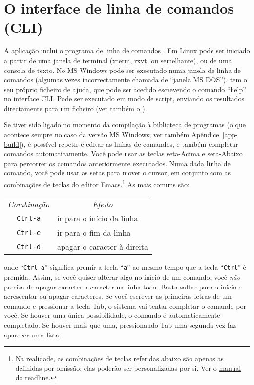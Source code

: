 \chapter{O interface de linha de comandos (CLI)}
\label{cli}

A aplicação  inclui o programa de linha de comandos .
Em Linux pode ser iniciado a partir de uma janela de terminal (xterm,
rxvt, ou semelhante), ou de uma consola de texto.  No MS Windows pode ser 
executado numa janela de linha de comandos (algumas vezes incorrectamente
chamada de ``janela MS DOS'').
 tem o seu próprio ficheiro de ajuda, que pode ser acedido
escrevendo o comando ``help'' no interface CLI. Pode ser executado em modo de
script, enviando os resultados directamente para um ficheiro
(ver também o \GCR).
    
Se  tiver sido ligado no momento da compilação à biblioteca de
programas  (o que acontece sempre no caso da versão MS Windows;
ver também Apêndice~\ref{app-build}), é possível repetir e editar as linhas
de comandos, e também completar comandos automaticamente.  Você pode usar as
teclas seta-Acima e seta-Abaixo para percorrer os comandos anteriormente
executados.  Numa dada linha de comando, você pode usar as setas para mover o
cursor, em conjunto com as combinações de teclas do editor Emacs.\footnote{Na realidade, as combinações de  teclas referidas abaixo são apenas as definidas por omissão; elas poderão ser personalizadas por si.
  Ver o \href{http://cnswww.cns.cwru.edu/~chet/readline/readline.html}{manual
    do readline}.} As mais comuns são:
%    
\begin{center}
  \begin{tabular}{cl}
    \textit{Combinação} & \multicolumn{1}{c}{\textit{Efeito}}\\
    \verb+Ctrl-a+ & ir para o início da linha\\
    \verb+Ctrl-e+ & ir para o fim da linha\\
    \verb+Ctrl-d+ & apagar o caracter à direita\\
  \end{tabular}
\end{center}
%
onde ``\verb+Ctrl-a+'' significa premir a tecla ``\verb+a+'' ao mesmo tempo
que a tecla ``\verb+Ctrl+'' é premida.  Assim, se você quiser alterar algo no
início de um comando, você \emph{não} precisa de apagar caracter a caracter
na linha toda.  Basta saltar para o início e acrescentar ou apagar caracteres.
Se você escrever as primeiras letras de um comando e pressionar a tecla Tab, o
sistema  vai tentar completar o comando por você.  Se houver uma
única possibilidade, o comando é automaticamente completado.  Se houver mais
que uma, pressionando Tab uma segunda vez faz aparecer uma lista.


